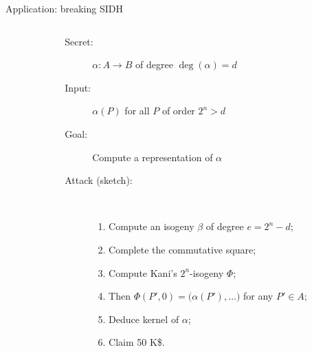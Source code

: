 \documentclass[aspectratio=169]{beamer}
\begin{document}
\begin{frame}{Application: breaking SIDH}
  \large
  \begin{columns}
    \begin{column}{0.4\textwidth}
      \centering
    \end{column}
    \begin{column}{0.6\textwidth}
      \begin{description}
      \item[Secret:] $α:A→B$ of degree $\deg(α) = d$
      \item[Input:] $α(P)$ for all $P$ of order $2^n > d$
      \item[Goal:] Compute a representation of $α$
      \item[Attack (sketch):]\
        \begin{enumerate}
        \item<2-> Compute an isogeny $β$ of degree \emph{$e = 2^n - d$};
        \item<3-> Complete the commutative square;
        \item<4-> Compute Kani's $2^n$-isogeny $Φ$;
        \item<5-> Then $Φ(P',0) = \bigl(α(P'), \dots\bigr)$ for any $P'∈A$;
        \item<6-> Deduce kernel of $α$;
        \item<7-> Claim 50 K\$.
        \end{enumerate}
      \end{description}
    \end{column}    
  \end{columns}
\end{frame}

\end{document}
